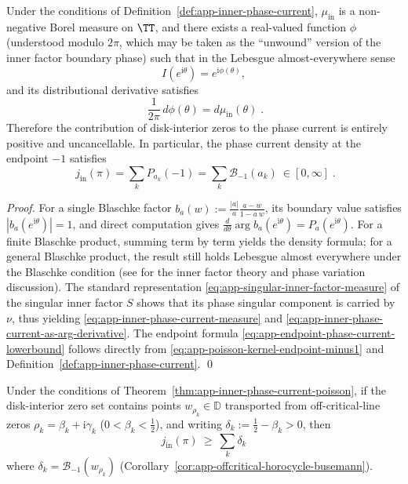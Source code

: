 \begin{theorem}\label{thm:app-inner-phase-current-poisson}
Under the conditions of Definition~\ref{def:app-inner-phase-current}, \(\mu_{\mathrm{in}}\) is a non-negative Borel measure on \(\TT\), and there exists a real-valued function \(\phi\) (understood modulo \(2\pi\), which may be taken as the ``unwound'' version of the inner factor boundary phase) such that in the Lebesgue almost-everywhere sense
\[
I(e^{\mathrm{i}\theta})=e^{\mathrm{i}\phi(\theta)},
\]
and its distributional derivative satisfies
\begin{equation}\label{eq:app-inner-phase-current-as-arg-derivative}
\boxed{\;
\frac{1}{2\pi}\,d\phi(\theta)=d\mu_{\mathrm{in}}(\theta)\; }.
\end{equation}
Therefore the contribution of disk-interior zeros to the phase current is entirely positive and uncancellable.
In particular, the phase current density at the endpoint \(-1\) satisfies
\begin{equation}\label{eq:app-endpoint-phase-current-lowerbound}
\boxed{\;
j_{\mathrm{in}}(\pi)
=\sum_k P_{a_k}(-1)
=\sum_k \mathcal{B}_{-1}(a_k)\ \in[0,\infty]\; }.
\end{equation}
\end{theorem}

\begin{proof}
For a single Blaschke factor \(b_a(w):=\frac{|a|}{a}\frac{a-w}{1-\overline a\,w}\), its boundary value satisfies \(|b_a(e^{\mathrm{i}\theta})|=1\), and direct computation gives
\(
\frac{d}{d\theta}\arg b_a(e^{\mathrm{i}\theta})=P_a(e^{\mathrm{i}\theta})
\).
For a finite Blaschke product, summing term by term yields the density formula; for a general Blaschke product, the result still holds Lebesgue almost everywhere under the Blaschke condition (see \cite{Duren1970TheoryHp,Garnett2007BoundedAnalyticFunctions} for the inner factor theory and phase variation discussion).
The standard representation \eqref{eq:app-singular-inner-factor-measure} of the singular inner factor \(S\) shows that its phase singular component is carried by \(\nu\), thus yielding \eqref{eq:app-inner-phase-current-measure} and \eqref{eq:app-inner-phase-current-as-arg-derivative}.
The endpoint formula \eqref{eq:app-endpoint-phase-current-lowerbound} follows directly from \eqref{eq:app-poisson-kernel-endpoint-minus1} and Definition~\ref{def:app-inner-phase-current}. \qed
\end{proof}

\begin{corollary}\label{cor:app-endpoint-phase-current-offcritical}
Under the conditions of Theorem~\ref{thm:app-inner-phase-current-poisson}, if the disk-interior zero set contains points \(w_{\rho_k}\in\mathbb{D}\) transported from off-critical-line zeros \(\rho_k=\beta_k+\mathrm{i}\gamma_k\) (\(0<\beta_k<\tfrac12\)), and writing \(\delta_k:=\tfrac12-\beta_k>0\), then
\[
\boxed{\;
j_{\mathrm{in}}(\pi)\ \ge\ \sum_k \delta_k\;}
\]
where \(\delta_k=\mathcal{B}_{-1}(w_{\rho_k})\) (Corollary~\ref{cor:app-offcritical-horocycle-busemann}).
\end{corollary}

